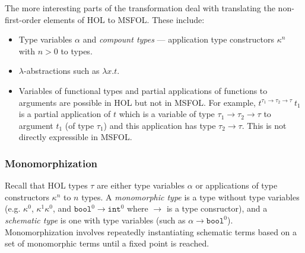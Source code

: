 \documentclass{article}
\begin{document}
	The more interesting parts of the 
	transformation deal with 
	translating the non-first-order
	elements of HOL to MSFOL. These 
	include:
	\begin{itemize}
		\item Type variables $\alpha$
		and \textit{compount types} ---
		application type constructors
		$\kappa^n$ with $n > 0$ to 
		types.
		\item $\lambda$-abstractions 
		such as $\lambda x. t$.
		\item Variables of functional 
		types and partial applications 
		of functions to arguments are 
		possible in HOL but not in 
		MSFOL. For example, 
		$t^{\tau_1 \to \tau_2 \to 
		\tau}\ t_1$ is a 
		partial application of $t$ 
		which is a variable of type 
		$\tau_1 \to \tau_2 \to \tau$
		to argument $t_1$ (of type 
		$\tau_1$) and this 
		application has type 
		$\tau_2 \to \tau$.
		This is not directly 
		expressible in MSFOL.
	\end{itemize}

	\subsubsection{Monomorphization}
		Recall that HOL types $\tau$ are 
		either type	variables $\alpha$ or 
		applications of type constructors 
		$\kappa^n$ to $n$ types.
		A \textit{monomorphic type} is a
		type without type variables 
		(e.g. $\kappa^0$, $\kappa^1 
		\kappa^0$, and $\texttt{bool}^0 
		\to \texttt{int}^0$ 
		where $\to$ is 
		a type consructor), and 
		a \textit{schematic type} is one 
		with type variables (such as 
		$\alpha \to \texttt{bool}^0$). 
		Monomorphization involves 
		repeatedly instantiating schematic
		terms based on a set of 
		monomorphic terms until a fixed 
		point is reached.
		
\end{document}
